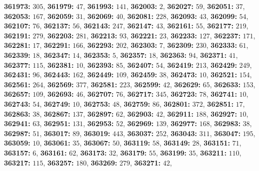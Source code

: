 \textsf{\bfseries 361973:} $305$, \textsf{\bfseries 361979:} $47$, \textsf{\bfseries 361993:} $141$, \textsf{\bfseries 362003:} $2$, \textsf{\bfseries 362027:} $59$, \textsf{\bfseries 362051:} $37$, \textsf{\bfseries 362053:} $167$, \textsf{\bfseries 362059:} $31$, \textsf{\bfseries 362069:} $40$, \textsf{\bfseries 362081:} $228$, \textsf{\bfseries 362093:} $43$, \textsf{\bfseries 362099:} $54$, \textsf{\bfseries 362107:} $76$, \textsf{\bfseries 362137:} $56$, \textsf{\bfseries 362143:} $247$, \textsf{\bfseries 362147:} $43$, \textsf{\bfseries 362161:} $55$, \textsf{\bfseries 362177:} $219$, \textsf{\bfseries 362191:} $279$, \textsf{\bfseries 362203:} $281$, \textsf{\bfseries 362213:} $93$, \textsf{\bfseries 362221:} $23$, \textsf{\bfseries 362233:} $127$, \textsf{\bfseries 362237:} $171$, \textsf{\bfseries 362281:} $17$, \textsf{\bfseries 362291:} $166$, \textsf{\bfseries 362293:} $202$, \textsf{\bfseries 362303:} $7$, \textsf{\bfseries 362309:} $230$, \textsf{\bfseries 362333:} $61$, \textsf{\bfseries 362339:} $18$, \textsf{\bfseries 362347:} $14$, \textsf{\bfseries 362353:} $5$, \textsf{\bfseries 362357:} $18$, \textsf{\bfseries 362363:} $94$, \textsf{\bfseries 362371:} $41$, \textsf{\bfseries 362377:} $115$, \textsf{\bfseries 362381:} $10$, \textsf{\bfseries 362393:} $85$, \textsf{\bfseries 362407:} $54$, \textsf{\bfseries 362419:} $213$, \textsf{\bfseries 362429:} $249$, \textsf{\bfseries 362431:} $96$, \textsf{\bfseries 362443:} $162$, \textsf{\bfseries 362449:} $109$, \textsf{\bfseries 362459:} $38$, \textsf{\bfseries 362473:} $10$, \textsf{\bfseries 362521:} $154$, \textsf{\bfseries 362561:} $264$, \textsf{\bfseries 362569:} $377$, \textsf{\bfseries 362581:} $223$, \textsf{\bfseries 362599:} $42$, \textsf{\bfseries 362629:} $65$, \textsf{\bfseries 362633:} $153$, \textsf{\bfseries 362657:} $109$, \textsf{\bfseries 362693:} $46$, \textsf{\bfseries 362707:} $76$, \textsf{\bfseries 362717:} $345$, \textsf{\bfseries 362723:} $78$, \textsf{\bfseries 362741:} $10$, \textsf{\bfseries 362743:} $54$, \textsf{\bfseries 362749:} $10$, \textsf{\bfseries 362753:} $48$, \textsf{\bfseries 362759:} $86$, \textsf{\bfseries 362801:} $372$, \textsf{\bfseries 362851:} $17$, \textsf{\bfseries 362863:} $38$, \textsf{\bfseries 362867:} $137$, \textsf{\bfseries 362897:} $62$, \textsf{\bfseries 362903:} $42$, \textsf{\bfseries 362911:} $188$, \textsf{\bfseries 362927:} $10$, \textsf{\bfseries 362941:} $63$, \textsf{\bfseries 362951:} $131$, \textsf{\bfseries 362953:} $52$, \textsf{\bfseries 362969:} $139$, \textsf{\bfseries 362977:} $168$, \textsf{\bfseries 362983:} $38$, \textsf{\bfseries 362987:} $51$, \textsf{\bfseries 363017:} $89$, \textsf{\bfseries 363019:} $443$, \textsf{\bfseries 363037:} $252$, \textsf{\bfseries 363043:} $311$, \textsf{\bfseries 363047:} $195$, \textsf{\bfseries 363059:} $10$, \textsf{\bfseries 363061:} $35$, \textsf{\bfseries 363067:} $50$, \textsf{\bfseries 363119:} $58$, \textsf{\bfseries 363149:} $28$, \textsf{\bfseries 363151:} $71$, \textsf{\bfseries 363157:} $6$, \textsf{\bfseries 363161:} $62$, \textsf{\bfseries 363173:} $32$, \textsf{\bfseries 363179:} $55$, \textsf{\bfseries 363199:} $35$, \textsf{\bfseries 363211:} $110$, \textsf{\bfseries 363217:} $115$, \textsf{\bfseries 363257:} $180$, \textsf{\bfseries 363269:} $279$, \textsf{\bfseries 363271:} $42$, 
